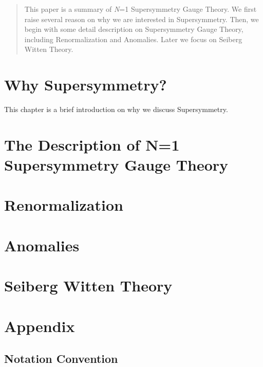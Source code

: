 \documentclass{fduthesis-en}
\begin{document}
\tableofcontents
\begin{abstract}
	This paper is a summary of \textit{N}=1 Supersymmetry 
	Gauge Theory. We first raise several reason on why we 
	are interested in Supersymmetry. Then, we begin with 
	some detail description on Supersymmetry Gauge Theory, 
	including Renormalization and Anomalies. Later we focus 
	on Seiberg Witten Theory. 
\end{abstract}
\chapter{Why Supersymmetry?}
	This chapter is a brief introduction on why we discuss 
	Supersymmetry. 
	
\chapter{The Description of N=1 Supersymmetry Gauge Theory}
\cite{ryder1996quantum}
\chapter{Renormalization}
\chapter{Anomalies}
\chapter{Seiberg Witten Theory}
\chapter{Appendix}
  \section{Notation Convention}
\printbibliography
\end{document}
